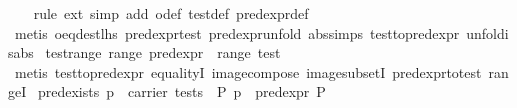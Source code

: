\begin{isabellebody}
%
\isadelimproof
\ \ %
\endisadelimproof
%
\isatagproof
{}\isamarkupfalse%
\ {}rule\ ext{}\ simp\ add{}\ o{}def\ test{}def\ pred{}expr{}def{}\isanewline
\ \ \isamarkupfalse%
\ {}metis\ o{}eq{}dest{}lhs\ pred{}expr{}test\ pred{}expr{}unfold\ abs{}simps{}{}{}\ test{}to{}pred{}expr\ unfold{}is{}abs{}%
\endisatagproof
{\isafoldproof}%
%
\isadelimproof
\isanewline
%
\endisadelimproof
\isanewline
{}\isamarkupfalse%
\ test{}range{}\ {}range\ pred{}expr\ {}\ range\ test{}\isanewline
%
\isadelimproof
\ \ %
\endisadelimproof
%
\isatagproof
{}\isamarkupfalse%
\ {}metis\ test{}to{}pred{}expr\ equalityI\ image{}compose\ image{}subsetI\ pred{}expr{}to{}test\ rangeI{}%
\endisatagproof
{\isafoldproof}%
%
\isadelimproof
\isanewline
%
\endisadelimproof
\isanewline
{}\isamarkupfalse%
\ pred{}exists{}\ {}p\ {}\ carrier\ tests\ {}\ {}P{}\ p\ {}\ pred{}expr\ P{}\isanewline

\end{isabellebody}
